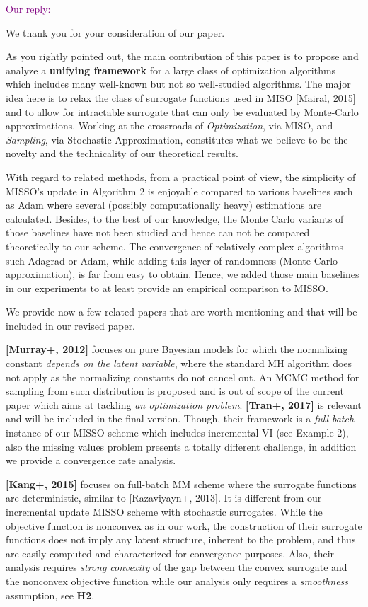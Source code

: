 \documentclass{article}
\begin{document}
\textcolor{purple}{Our reply:}

We thank you for your consideration of our paper.

As you rightly pointed out, the main contribution of this paper is to propose and analyze a \textbf{unifying framework} for a large class of optimization algorithms which includes many well-known but not so well-studied algorithms.
The major idea here is to relax the class of surrogate functions used in MISO [Mairal, 2015] and to allow for intractable surrogate that can only be evaluated by Monte-Carlo approximations.
Working at the crossroads of \emph{Optimization}, via MISO, and \emph{Sampling}, via Stochastic Approximation, constitutes what we believe to be the novelty and the technicality of our theoretical results.

With regard to related methods, from a practical point of view, the simplicity of MISSO's update in Algorithm 2 is enjoyable compared to various baselines such as Adam where several (possibly computationally heavy) estimations are calculated.
Besides, to the best of our knowledge, the Monte Carlo variants of those baselines have not been studied and hence can not be compared theoretically to our scheme.
The convergence of relatively complex algorithms such Adagrad or Adam, while adding this layer of randomness (Monte Carlo approximation), is far from easy to obtain.
Hence, we added those main baselines in our experiments to at least provide an empirical comparison to MISSO.

We provide now a few related papers that are worth mentioning and that will be included in our revised paper.

\textbf{[Murray+, 2012]} focuses on pure Bayesian models for which the normalizing constant \emph{depends on the latent variable}, where the standard MH algorithm does not apply as the normalizing constants do not cancel out. An MCMC method for sampling from such distribution is proposed and is out of scope of the current paper which aims at tackling \emph{an optimization problem}.
\textbf{[Tran+, 2017]} is relevant and will be included in the final version. 
Though, their framework is a \emph{full-batch} instance of our MISSO scheme which includes incremental VI (see Example 2), also the missing values problem presents a totally different challenge, in addition we provide a convergence rate analysis.


\textbf{[Kang+, 2015]} focuses on full-batch MM scheme where the surrogate functions are deterministic, similar to [Razaviyayn+, 2013]. It is different from our incremental update MISSO scheme with stochastic surrogates.
 While the objective function is nonconvex as in our work, the construction of their surrogate functions does not imply any latent structure, inherent to the problem, and thus are easily computed and characterized for convergence purposes. 
Also, their analysis requires \emph{strong convexity} of the gap between the convex surrogate and the nonconvex objective function while our analysis only requires a \emph{smoothness} assumption, see \textbf{H2}.\vspace{-5pt}
\end{document}
